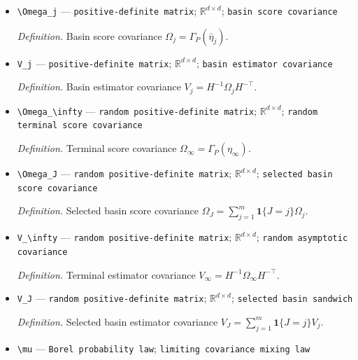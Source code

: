 \documentclass{article}
\begin{document}
\begin{itemize}
  \par\smallskip\noindent\emph{Definition.} State-indexed IPW score covariance \(\Gamma_P(\eta)=E_P[\sum_{a\in\mathcal A}g(a,X_t,Y_t(a);\theta^*)g(a,X_t,Y_t(a);\theta^*)^\top/\Pi(a\mid X_t,\eta)]\).
  \item \texttt{\textbackslash{}\allowbreak{}Omega\_\allowbreak{}j} --- \texttt{positive-\allowbreak{}definite matrix}; \(\mathbb R^{d\times d}\); \texttt{basin score covariance}
  \par\smallskip\noindent\emph{Definition.} Basin score covariance \(\Omega_j=\Gamma_P(\bar\eta_j)\).
  \item \texttt{V\_\allowbreak{}j} --- \texttt{positive-\allowbreak{}definite matrix}; \(\mathbb R^{d\times d}\); \texttt{basin estimator covariance}
  \par\smallskip\noindent\emph{Definition.} Basin estimator covariance \(V_j=H^{-1}\Omega_jH^{-\top}\).
  \item \texttt{\textbackslash{}\allowbreak{}Omega\_\allowbreak{}\textbackslash{}\allowbreak{}infty} --- \texttt{random positive-\allowbreak{}definite matrix}; \(\mathbb R^{d\times d}\); \texttt{random terminal score covariance}
  \par\smallskip\noindent\emph{Definition.} Terminal score covariance \(\Omega_\infty=\Gamma_P(\eta_\infty)\).
  \item \texttt{\textbackslash{}\allowbreak{}Omega\_\allowbreak{}J} --- \texttt{random positive-\allowbreak{}definite matrix}; \(\mathbb R^{d\times d}\); \texttt{selected basin score covariance}
  \par\smallskip\noindent\emph{Definition.} Selected basin score covariance \(\Omega_J=\sum_{j=1}^m\mathbf1\{J=j\}\Omega_j\).
  \item \texttt{V\_\allowbreak{}\textbackslash{}\allowbreak{}infty} --- \texttt{random positive-\allowbreak{}definite matrix}; \(\mathbb R^{d\times d}\); \texttt{random asymptotic covariance}
  \par\smallskip\noindent\emph{Definition.} Terminal estimator covariance \(V_\infty=H^{-1}\Omega_\infty H^{-\top}\).
  \item \texttt{V\_\allowbreak{}J} --- \texttt{random positive-\allowbreak{}definite matrix}; \(\mathbb R^{d\times d}\); \texttt{selected basin sandwich}
  \par\smallskip\noindent\emph{Definition.} Selected basin estimator covariance \(V_J=\sum_{j=1}^m\mathbf1\{J=j\}V_j\).
  \item \texttt{\textbackslash{}\allowbreak{}mu} --- \texttt{Borel probability law}; \texttt{limiting covariance mixing law}

\end{itemize}
\end{document}

